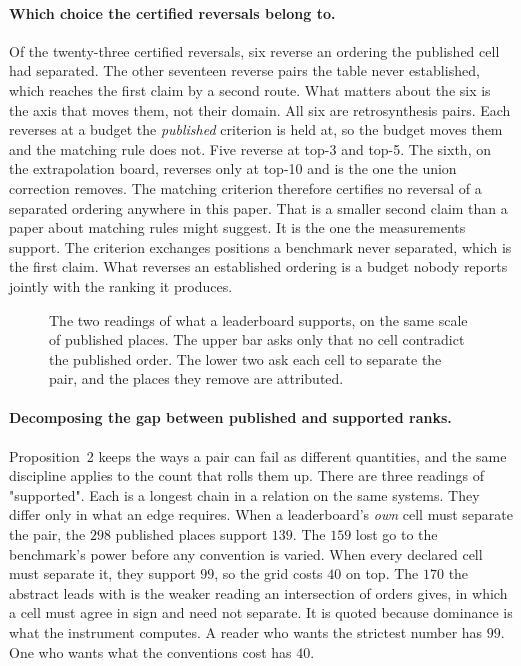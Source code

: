 \documentclass{article}
\begin{document}
\paragraph{Which choice the certified reversals belong to.} Of the
twenty-three certified reversals, six reverse an ordering the published cell had separated. The other
seventeen reverse pairs the table never established, which reaches the first claim by a second route.
What matters about the six is the axis that moves them, not their domain. All six are
retrosynthesis pairs. Each reverses at a budget the \emph{published} criterion is held at, so the
budget moves them and the matching rule does not. Five reverse at top-3 and top-5. The sixth, on the
extrapolation board, reverses only at top-10 and is the one the union correction removes. The
matching criterion therefore certifies no reversal of a separated ordering anywhere in this paper.
That is a smaller second claim than a paper about matching rules might suggest. It is the one the
measurements support. The criterion exchanges positions a benchmark never separated, which is the
first claim. What reverses an established ordering is a budget nobody reports jointly with the
ranking it produces.

\begin{figure}[t]
\begin{center}

\end{center}
\caption{The two readings of what a leaderboard supports, on the same scale of published places.
The upper bar asks only that no cell contradict the published order. The lower two ask each cell to
separate the pair, and the places they remove are attributed.}
\label{fig:decomp}
\end{figure}


\paragraph{Decomposing the gap between published and supported ranks.} Proposition~2 keeps the
ways a pair can fail as different quantities, and the same discipline applies to the count that
rolls them up. There are three readings of
"supported". Each is a longest chain in a relation on the same systems. They differ only in what an
edge requires. When a leaderboard's \emph{own} cell must separate the pair, the $298$ published
places support $139$. The $159$ lost go to the benchmark's power before any convention is varied.
When every declared cell must separate it, they support $99$, so the grid costs $40$ on top. The
$170$ the abstract leads with is the weaker reading an intersection of orders gives, in which a cell
must agree in sign and need not separate. It is quoted because dominance is what the instrument
computes. A reader who wants the strictest number has $99$. One who wants what the conventions cost
has $40$.
\end{document}

